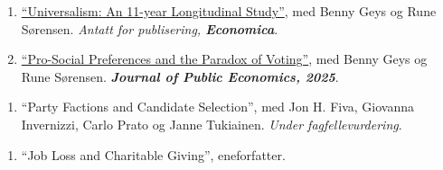 \begin{enumerate}[resume]
    \item \href{https://onlinelibrary.wiley.com/doi/full/10.1111/ecca.70058}{``Universalism: An 11-year Longitudinal Study''}, med Benny Geys og Rune S{\o}rensen. \textit{Antatt for publisering, \textbf{Economica}}.
    \item \href{https://www.sciencedirect.com/science/article/pii/S004727272500177X}{``Pro-Social Preferences and the Paradox of Voting''}, med Benny Geys og Rune S{\o}rensen. \textit{\textbf{Journal of Public Economics, 2025}}.
\end{enumerate}
\begin{enumerate}[resume]
    \item ``Party Factions and Candidate Selection'', med Jon H. Fiva, Giovanna Invernizzi, Carlo Prato og Janne Tukiainen. \textit{Under fagfellevurdering}.
\end{enumerate}
\begin{enumerate}[resume]
    \item ``Job Loss and Charitable Giving'', eneforfatter.
\end{enumerate}